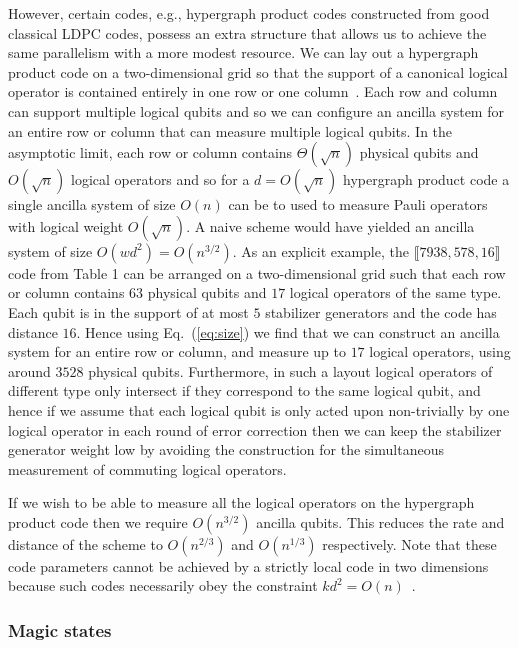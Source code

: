 \documentclass[reprint,
superscriptaddress,
 amsmath,amssymb,
 aps, longbibliography
]{revtex4-1}
\begin{document}
However, certain codes, e.g., hypergraph product codes constructed from good classical LDPC codes, possess an extra structure that allows us to achieve the same parallelism with a more modest resource. We can lay out a hypergraph product code on a two-dimensional grid so that the support of a canonical logical operator is contained entirely in one row or one column~\cite{Kovalev2013}. Each row and column can support multiple logical qubits and so we can configure an ancilla system for an entire row or column that can measure multiple logical qubits. In the asymptotic limit, each row or column contains $\Theta(\sqrt{n})$ physical qubits and $O(\sqrt{n})$ logical operators and so for a $d = O(\sqrt{n})$ hypergraph product code a single ancilla system of size $O(n)$ can be to used to measure Pauli operators with logical weight $O(\sqrt{n})$. A naive scheme would have yielded an ancilla system of size $O(wd^2 ) = O(n^{3/2})$. As an explicit example, the $\llbracket 7938, 578, 16 \rrbracket$ code from Table 1 can be arranged on a two-dimensional grid such that each row or column contains $63$ physical qubits and $17$ logical operators of the same type. Each qubit is in the support of at most $5$ stabilizer generators and the code has distance $16$. Hence using Eq.~(\ref{eq:size}) we find that we can construct an ancilla system for an entire row or column, and measure up to $17$ logical operators, using around $3528$ physical qubits. Furthermore, in such a layout logical operators of different type only intersect if they correspond to the same logical qubit, and hence if we assume that each logical qubit is only acted upon non-trivially by one logical operator in each round of error correction then we can keep the stabilizer generator weight low by avoiding the construction for the simultaneous measurement of commuting logical operators.

If we wish to be able to measure all the logical operators on the hypergraph product code then we require $O(n^{3/2})$ ancilla qubits. This reduces the rate and distance of the scheme to $O(n^{2/3})$ and $O(n^{1/3})$ respectively. Note that these code parameters cannot be achieved by a strictly local code in two dimensions because such codes necessarily obey the constraint $kd^2 = O(n)$~\cite{Bravyi2010}.

\subsubsection{\label{sec:scheme}Magic states}
\end{document}
